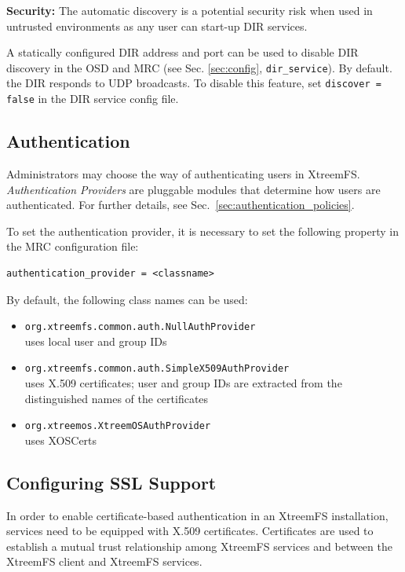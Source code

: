 \documentclass[a4paper,10pt]{book}
\begin{document}
\textbf{Security:} The automatic discovery is a potential security risk when used in untrusted environments as any user can start-up DIR services.

A statically configured DIR address and port can be used to disable DIR discovery in the OSD and MRC (see Sec. \ref{sec:config}, \texttt{dir\_service}). By default. the DIR responds to UDP broadcasts. To disable this feature, set  \texttt{discover = false} in the DIR service config file.


\subsection{Authentication}
\label{sec:AuthProvider}
Administrators may choose the way of authenticating users in XtreemFS. \emph{Authentication Providers} are pluggable modules that determine how users are authenticated. For further details, see Sec.\ \ref{sec:authentication_policies}.

To set the authentication provider, it is necessary to set the following property in the MRC configuration file:

\begin{verbatim}
authentication_provider = <classname>
\end{verbatim}

By default, the following class names can be used:

\begin{itemize}
 \item \texttt{org.xtreemfs.common.auth.NullAuthProvider}\\
uses local user and group IDs
 \item \texttt{org.xtreemfs.common.auth.SimpleX509AuthProvider}\\
uses X.509 certificates; user and group IDs are extracted from the distinguished names of the certificates
 \item \texttt{org.xtreemos.XtreemOSAuthProvider}\\
uses XOSCerts
\end{itemize}


\subsection{Configuring SSL Support}

In order to enable certificate-based authentication in an XtreemFS installation, services need to be equipped with X.509 certificates. Certificates are used to establish a mutual trust relationship among XtreemFS services and between the XtreemFS client and XtreemFS services.
\end{document}
